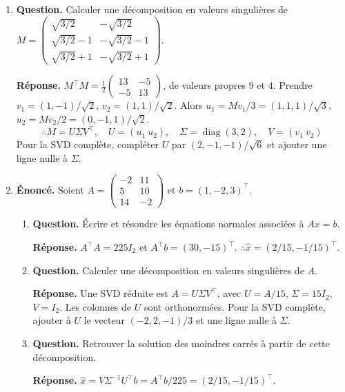 \documentclass[12pt, a4paper]{article}
\begin{document}
\begin{enumerate}[label=9.\arabic*., start=94]
  \item \begin{minipage}[t]{\linewidth}\raggedright
\textbf{Question.} Calculer une décomposition en valeurs singulières de $\displaystyle M=\begin{pmatrix}\sqrt{3/2}&-\sqrt{3/2}\\\sqrt{3/2}-1&-\sqrt{3/2}-1\\\sqrt{3/2}+1&-\sqrt{3/2}+1\end{pmatrix}$.
\par\smallskip
\textbf{Réponse.} $M^\top M=\frac12\begin{pmatrix}13&-5\\-5&13\end{pmatrix}$, de valeurs propres $9$ et $4$.
    Prendre $v_1=(1,-1)/\sqrt2$, $v_2=(1,1)/\sqrt2$.
    Alors $u_1=Mv_1/3=(1,1,1)/\sqrt3$, $u_2=Mv_2/2=(0,-1,1)/\sqrt2$.
    \[
      \therefore M=U\Sigma V^\top,\quad U=(u_1\ u_2),\quad\Sigma=\operatorname{diag}(3,2),\quad V=(v_1\ v_2)
    \]
    Pour la SVD complète, compléter $U$ par $(2,-1,-1)/\sqrt6$ et ajouter une ligne nulle à $\Sigma$.
\end{minipage}

  \item \begin{minipage}[t]{\linewidth}\raggedright
\textbf{Énoncé.} Soient $A=\begin{pmatrix}-2&11\\5&10\\14&-2\end{pmatrix}$ et $b=(1,-2,3)^\top$.

\begin{enumerate}[\arabic*.]
        \item \textbf{Question.} Écrire et résoudre les équations normales associées à $Ax=b$.
\par\smallskip
\textbf{Réponse.} $A^\top A=225I_2$ et $A^\top b=(30,-15)^\top$.
        $\therefore\widehat x=(2/15,-1/15)^\top$.

  \item \textbf{Question.} Calculer une décomposition en valeurs singulières de $A$.
\par\smallskip
\textbf{Réponse.} Une SVD réduite est $A=U\Sigma V^\top$, avec $U=A/15$, $\Sigma=15I_2$, $V=I_2$.
        Les colonnes de $U$ sont orthonormées.
        Pour la SVD complète, ajouter à $U$ le vecteur $(-2,2,-1)/3$ et une ligne nulle à $\Sigma$.

  \item \textbf{Question.} Retrouver la solution des moindres carrés à partir de cette décomposition.
\par\smallskip
\textbf{Réponse.} $\widehat x=V\Sigma^{-1}U^\top b=A^\top b/225=(2/15,-1/15)^\top$.


\end{enumerate}
\end{minipage}
\end{enumerate}
\end{document}
